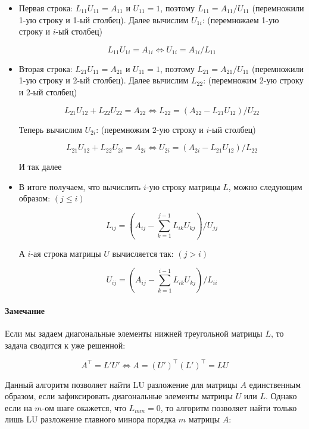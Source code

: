 \begin{itemize}
    \item Первая строка: $L_{11}U_{11} = A_{11}$ и $U_{11} = 1$, поэтому $L_{11} = A_{11} / U_{11}$ (перемножили 1-ую строку и 1-ый столбец). Далее вычислим $U_{1i}$: (перемножаем 1-ую строку и $i$-ый столбец)

    \[
    L_{11}U_{1i} = A_{1i} \iff U_{1i} = A_{1i} / L_{11}
    \]

    \item Вторая строка: $L_{21}U_{11} = A_{21}$ и $U_{11} = 1$, поэтому $L_{21} = A_{21} / U_{11}$ (перемножили 1-ую строку и 2-ый столбец). Далее вычислим $L_{22}$: (перемножим 2-ую строку и 2-ый столбец)

    \[
    L_{21}U_{12} + L_{22}U_{22} = A_{22} \iff L_{22} = (A_{22} - L_{21}U_{12}) / U_{22}
    \]

    Теперь вычислим $U_{2i}$: (перемножим 2-ую строку и $i$-ый столбец)

    \[
    L_{21}U_{12} + L_{22}U_{2i} = A_{2i} \iff U_{2i} = (A_{2i} - L_{21}U_{12}) / L_{22}
    \]

    И так далее

    \item В итоге получаем, что вычислить $i$-ую строку матрицы $L$, можно следующим образом: $(j \leqslant i)$

    \[
    L_{ij} = \left(A_{ij} - \sum\limits_{k = 1}^{j - 1} L_{ik}U_{kj}\right) / U_{jj}
    \]

    А $i$-ая строка матрицы $U$ вычисляется так: $(j > i)$

    \[
    U_{ij} = \left(A_{ij} - \sum\limits_{k = 1}^{i-1}L_{ik}U_{kj}\right) / L_{ii}
    \]
\end{itemize}

\paragraph{Замечание}

Если мы задаем диагональные элементы нижней треугольной матрицы $L$, то задача сводится к уже решенной:

\[
A^{\top} = L'U' \iff A = (U')^{\top} (L')^{\top} = LU
\]

Данный алгоритм позволяет найти LU разложение для матрицы $A$ единственным образом, если зафиксировать диагональные элементы матрицы $U$ или $L$. Однако если на $m$-ом шаге окажется, что $L_{mm} = 0$, то алгоритм позволяет найти только лишь LU разложение главного минора порядка $m$ матрицы $A$:

